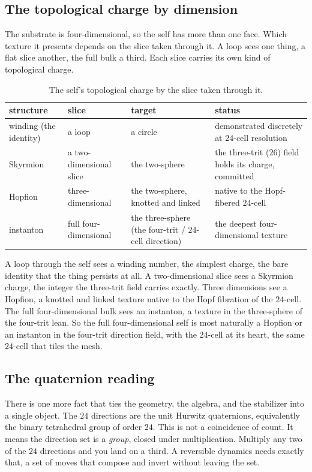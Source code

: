 \subsection{The topological charge by dimension}

The substrate is four-dimensional, so the self has more than one face. Which texture it presents depends on the slice taken through it. A loop sees one thing, a flat slice another, the full bulk a third. Each slice carries its own kind of topological charge.

\begin{table}[ht]
\centering
\begin{tabular}{@{}llll@{}}
\toprule
structure & slice & target & status \\
\midrule
winding (the identity) & a loop & a circle & demonstrated discretely at $24$-cell resolution \\
Skyrmion & a two-dimensional slice & the two-sphere & the three-trit ($26$) field holds its charge, committed \\
Hopfion & three-dimensional & the two-sphere, knotted and linked & native to the Hopf-fibered $24$-cell \\
instanton & full four-dimensional & the three-sphere (the four-trit / $24$-cell direction) & the deepest four-dimensional texture \\
\bottomrule
\end{tabular}
\caption{The self's topological charge by the slice taken through it.}
\label{tab:charge-by-dim}
\end{table}

A loop through the self sees a winding number, the simplest charge, the bare identity that the thing persists at all. A two-dimensional slice sees a Skyrmion charge, the integer the three-trit field carries exactly. Three dimensions see a Hopfion, a knotted and linked texture native to the Hopf fibration of the $24$-cell. The full four-dimensional bulk sees an instanton, a texture in the three-sphere of the four-trit lean. So the full four-dimensional self is most naturally a Hopfion or an instanton in the four-trit direction field, with the $24$-cell at its heart, the same $24$-cell that tiles the mesh.

\subsection{The quaternion reading}

There is one more fact that ties the geometry, the algebra, and the stabilizer into a single object. The $24$ directions are the unit Hurwitz quaternions, equivalently the binary tetrahedral group of order $24$. This is not a coincidence of count. It means the direction set is a \emph{group}, closed under multiplication. Multiply any two of the $24$ directions and you land on a third. A reversible dynamics needs exactly that, a set of moves that compose and invert without leaving the set.

